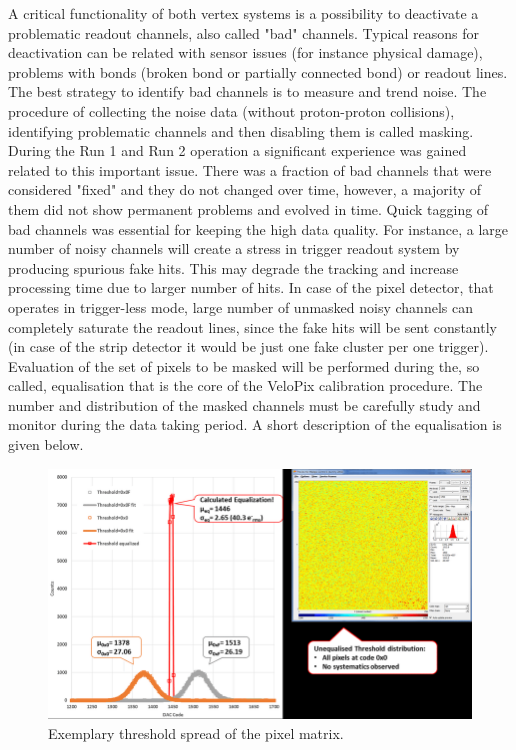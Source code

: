 A critical functionality of both vertex systems is a possibility to deactivate a problematic readout channels, also called "bad" channels. Typical reasons for deactivation can be related with sensor issues (for instance physical damage), problems with bonds (broken bond or partially connected bond) or readout lines. The best strategy to identify bad channels is to measure and trend noise.
The procedure of collecting the noise data (without proton-proton collisions), identifying problematic channels and then disabling them is called masking. During the Run 1 and Run 2 operation a significant experience was gained related to this important issue. There was a fraction of bad channels that were considered "fixed" and they do not changed over time, however, a majority of them did not show permanent problems and evolved in time. Quick tagging of bad channels was essential for keeping the high data quality. For instance, a large number of noisy channels will create a stress in trigger readout system by producing spurious fake hits. This may degrade the tracking and increase processing time due to larger number of hits. In case of the pixel detector, that operates in trigger-less mode, large number of unmasked noisy channels can completely saturate the readout lines, since the fake hits will be sent constantly (in case of the strip detector it would be just one fake cluster per one trigger). Evaluation of the set of pixels to be masked will be performed during the, so called, equalisation that is the core of the VeloPix calibration procedure. The number and distribution of the masked channels must be carefully study and monitor during the data taking period. A short description of the equalisation is given below.





\begin{figure}
    \centering
    \includegraphics[width=0.7\linewidth]{figures/chapter2/Threshold-spread-in-the-pixel-matrix.png}
    \caption{Exemplary threshold spread of the pixel matrix.}
    \label{plot:velopix_thresholding}
\end{figure}

